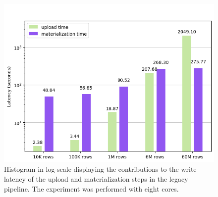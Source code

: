 \begin{figure}
\begin{minipage}[b]{\textwidth}
        \includegraphics[width=\textwidth]{figures/7-appendix/results_diagrams/write/hudi_upload_materialize/hudi_virtualiz8_core.png}
        \caption[Histogram of write on legacy pipeline - Latency breakdown - 8 CPU cores]{Histogram in log-scale displaying the contributions to the write latency of the upload and materialization steps in the legacy pipeline. The experiment was performed with eight  cores.}
        \label{fig:appx_hudi_virtualiz_breakdown_8_core}
    \end{minipage}
\end{figure}